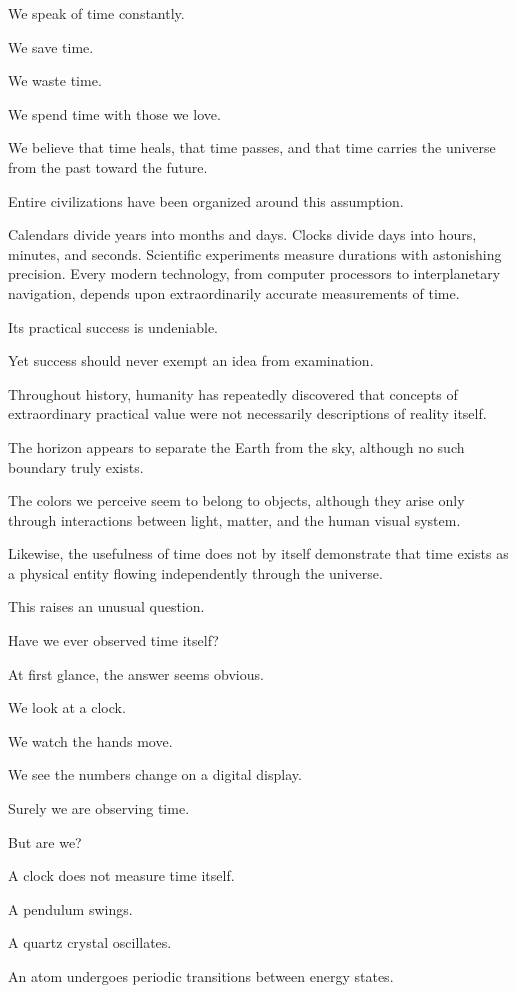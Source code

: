 We speak of time constantly.

We save time.

We waste time.

We spend time with those we love.

We believe that time heals, that time passes, and that time carries the universe from the past toward the future.

Entire civilizations have been organized around this assumption.

Calendars divide years into months and days. Clocks divide days into hours, minutes, and seconds. Scientific experiments measure durations with astonishing precision. Every modern technology, from computer processors to interplanetary navigation, depends upon extraordinarily accurate measurements of time.

Its practical success is undeniable.

Yet success should never exempt an idea from examination.

Throughout history, humanity has repeatedly discovered that concepts of extraordinary practical value were not necessarily descriptions of reality itself.

The horizon appears to separate the Earth from the sky, although no such boundary truly exists.

The colors we perceive seem to belong to objects, although they arise only through interactions between light, matter, and the human visual system.

Likewise, the usefulness of time does not by itself demonstrate that time exists as a physical entity flowing independently through the universe.

This raises an unusual question.

Have we ever observed time itself?

At first glance, the answer seems obvious.

We look at a clock.

We watch the hands move.

We see the numbers change on a digital display.

Surely we are observing time.

But are we?

A clock does not measure time itself.

A pendulum swings.

A quartz crystal oscillates.

An atom undergoes periodic transitions between energy states.

